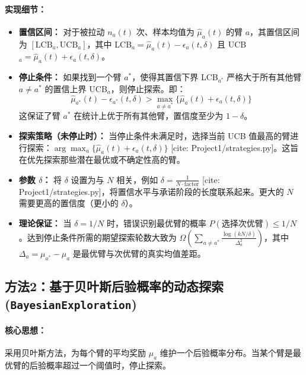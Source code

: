 \documentclass[8pt, a4paper]{ctexart} %
\begin{document}
\paragraph{实现细节：}
\begin{itemize}
    \item \textbf{置信区间：} 对于被拉动 $n_a(t)$ 次、样本均值为 $\hat{\mu}_a(t)$ 的臂 $a$，其置信区间为 $[\text{LCB}_a, \text{UCB}_a]$，其中 LCB$_a = \hat{\mu}_a(t) - \epsilon_a(t, \delta)$ 且 UCB$_a = \hat{\mu}_a(t) + \epsilon_a(t, \delta)$。
    \item \textbf{停止条件：} 如果找到一个臂 $a^*$，使得其置信下界 LCB$_{a^*}$ 严格大于所有其他臂 $a \neq a^*$ 的置信上界 UCB$_a$，则停止探索。即：
    $$\hat{\mu}_{a^*}(t) - \epsilon_{a^*}(t, \delta) > \max_{a \neq a^*} \{ \hat{\mu}_a(t) + \epsilon_a(t, \delta) \}$$
    这保证了臂 $a^*$ 在统计上优于所有其他臂，置信度至少为 $1-\delta$。
    \item \textbf{探索策略（未停止时）：} 当停止条件未满足时，选择当前 UCB 值最高的臂进行探索：$\arg\max_a \{\hat{\mu}_a(t) + \epsilon_a(t, \delta)\}$ [cite: Project1/strategies.py]。这旨在优先探索那些潜在最优或不确定性高的臂。
    \item \textbf{参数 $\delta$：} 将 $\delta$ 设置为与 $N$ 相关，例如 $\delta = \frac{1}{N \cdot \text{factor}}$ [cite: Project1/strategies.py]，将置信水平与承诺阶段的长度联系起来。更大的 $N$ 需要更高的置信度（更小的 $\delta$）。
    \item \textbf{理论保证：} 当 $\delta=1/N$ 时，错误识别最优臂的概率 $P(\text{选择次优臂}) \le 1/N$。达到停止条件所需的期望探索轮数大致为 $\Omega(\sum_{a \neq a^*} \frac{\log(kN/\delta)}{\Delta_a^2})$，其中 $\Delta_a = \mu_{a^*} - \mu_a$ 是最优臂与次优臂的真实均值差距。
\end{itemize}

\subsection{方法2：基于贝叶斯后验概率的动态探索 (\texttt{BayesianExploration})}

\paragraph{核心思想：} 采用贝叶斯方法，为每个臂的平均奖励 $\mu_a$ 维护一个后验概率分布。当某个臂是最优臂的后验概率超过一个阈值时，停止探索。
\end{document}
